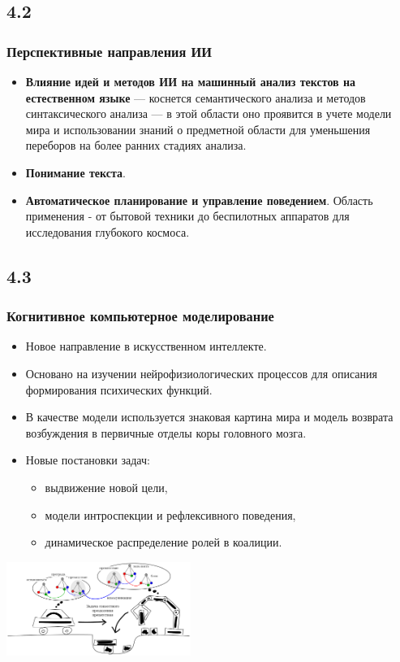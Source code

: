 \documentclass[default]{beamer}
\begin{document}
	\subsection{4.2}
	\begin{frame}
		\frametitle{Перспективные направления ИИ}
		
		\begin{itemize}
			\item \textbf{Влияние идей и методов ИИ на машинный анализ текстов на естественном языке} --- коснется  семантического анализа и методов синтаксического анализа --- в этой области оно проявится в учете модели мира и использовании знаний о предметной области  для уменьшения переборов  на более ранних стадиях анализа.
			\item \textbf{Понимание текста}.
			\item \textbf{Автоматическое планирование и управление поведением}. Область применения  - от бытовой  техники до беспилотных аппаратов для исследования глубокого космоса.
		\end{itemize}
		
	\end{frame}

	\subsection{4.3}
	\begin{frame}
		\frametitle{Когнитивное компьютерное моделирование}
		\small
		\begin{itemize}
			\item Новое направление в искусственном интеллекте.
			\item Основано на изучении нейрофизиологических процессов для описания формирования психических функций.
			\item В качестве модели используется знаковая картина мира и модель возврата возбуждения в первичные отделы коры головного мозга.
			\item Новые постановки задач:
			\begin{itemize}
				\item выдвижение новой цели,
				\item модели интроспекции и рефлексивного поведения,
				\item динамическое распределение ролей в коалиции.
			\end{itemize}
		\end{itemize}
		\centering
		\includegraphics[width=0.45\textwidth]{examples/signs/robotic_signs.png}
	\end{frame}
\end{document}
